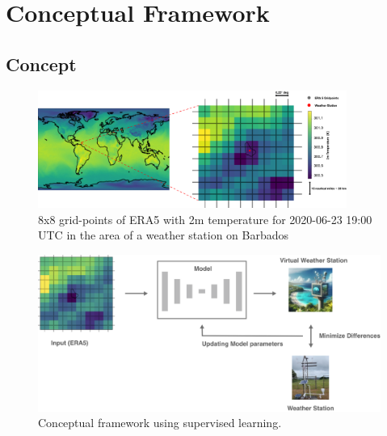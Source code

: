 \section{Conceptual Framework}
\label{sec: design}

\subsection{Concept}

\begin{figure}
    \centering
    \includegraphics[width=0.9\textwidth]{resources/images/ERA5_tas_around_barbados.png}
    \caption{8x8 grid-points of ERA5 with 2m temperature 
    for 2020-06-23 19:00 UTC  in the area of a weather station on Barbados}    
    \label{fig: barbados}
\end{figure}

\begin{figure}
    \centering
    \includegraphics[width=\textwidth]{resources/images/supervised_learning.png}
    \caption{Conceptual framework using supervised learning.}
    \label{fig: supervised_learning}
\end{figure}

